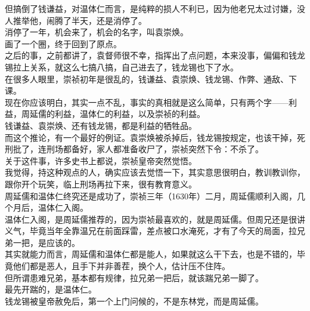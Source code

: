 \begin{multicols}{\theparacolNo}
但搞倒了钱谦益，对温体仁而言，是纯粹的损人不利已，因为他老兄太过讨嫌，没人推举他，闹腾了半天，还是消停了。\\

消停了一年，机会来了，机会的名字，叫袁崇焕。\\

画了一个圈，终于回到了原点。\\

之后的事，之前都讲了，袁督师很不幸，指挥出了点问题，本来没事，偏偏和钱龙锡拉上关系，就这么七搞八搞，自己进去了，钱龙锡也下了水。\\

在很多人眼里，崇祯初年是很乱的，钱谦益、袁崇焕、钱龙锡、作弊、通敌、下课。\\

现在你应该明白，其实一点不乱，事实的真相就是这么简单，只有两个字——利益，周延儒的利益，温体仁的利益，以及崇祯的利益。\\

钱谦益、袁崇焕、还有钱龙锡，都是利益的牺牲品。\\

而这个推论，有一个最好的例证。袁崇焕被杀掉后，钱龙锡按规定，也该干掉，死刑批了，连刑场都备好，家人都准备收尸了，崇祯突然下令：不杀了。\\

关于这件事，许多史书上都说，崇祯皇帝突然觉悟。\\

我觉得，持这种观点的人，确实应该去觉悟一下，其实意思很明白，教训教训你，跟你开个玩笑，临上刑场再拉下来，很有教育意义。\\

周延儒和温体仁终究还是成功了，崇祯三年（1630年）二月，周延儒顺利入阁，几个月后，温体仁入阁。\\

温体仁入阁，是周延儒推荐的，因为崇祯最喜欢的，就是周延儒。但周兄还是很讲义气，毕竟当年全靠温兄在前面踩雷，差点被口水淹死，才有了今天的局面，拉兄弟一把，是应该的。\\

其实就能力而言，周延儒和温体仁都是能人，如果就这么干下去，也是不错的，毕竟他们都是恶人，且手下并非善茬，换个人，估计压不住阵。\\

但所谓患难兄弟，基本都有规律，拉兄弟一把后，就该踹兄弟一脚了。\\

最先开踹的，是温体仁。\\

钱龙锡被皇帝赦免后，第一个上门问候的，不是东林党，而是周延儒。\\


\end{multicols}
